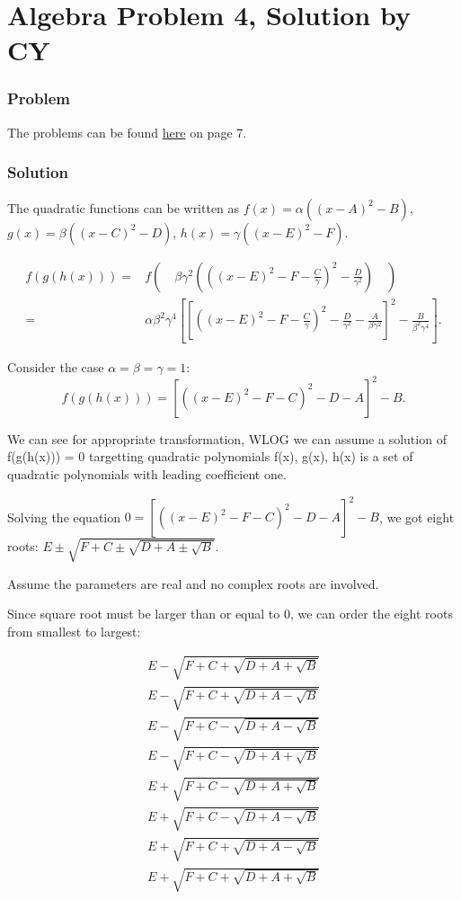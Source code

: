 \section*{Algebra Problem 4, Solution by CY}
\subsubsection*{Problem}
The problems can be found \href{https://www.math.hkust.edu.hk/~makyli/190_2010Sp/problemBk.pdf}{here} on page 7.

\subsubsection*{Solution}

The quadratic functions can be written as $f(x) = \alpha ((x-A)^2 - B)$, $g(x) = \beta ((x-C)^2 - D)$, $h(x) = \gamma ((x-E)^2 - F)$. 

\begin{eqnarray*}
    f(g(h(x))) =& f(\quad \beta \gamma^2(((x-E)^2-F-\frac{C}{\gamma})^2 - \frac{D}{\gamma^2}) \quad ) \\
    =& \alpha \beta^2 \gamma^4 [ [ ((x-E)^2-F-\frac{C}{\gamma})^2 - \frac{D}{\gamma^2} - \frac{A}{\beta\gamma^2} ]^2 - \frac{B}{\beta^2\gamma^4} ]. 
\end{eqnarray*}

Consider the case $\alpha = \beta = \gamma = 1$:
\begin{equation*}
    f(g(h(x))) = [((x-E)^2 - F - C)^2 - D - A]^2 - B.
\end{equation*}

We can see for appropriate transformation, WLOG we can assume a solution of f(g(h(x))) = 0 targetting quadratic polynomials f(x), g(x), h(x) is a set of quadratic polynomials with leading coefficient one.

\hspace{3em}

Solving the equation $ 0 = [((x-E)^2 - F - C)^2 - D - A]^2 - B $, we got eight roots: $E \pm \sqrt{F+C \pm \sqrt{D+A \pm \sqrt{B}}}$.

Assume the parameters are real and no complex roots are involved.

Since square root must be larger than or equal to 0, we can order the eight roots from smallest to largest:

\begin{eqnarray*}
    E - \sqrt{F+C + \sqrt{D+A + \sqrt{B}}} \\ 
    E - \sqrt{F+C + \sqrt{D+A - \sqrt{B}}} \\ 
    E - \sqrt{F+C - \sqrt{D+A - \sqrt{B}}} \\ 
    E - \sqrt{F+C - \sqrt{D+A + \sqrt{B}}} \\ 
    E + \sqrt{F+C - \sqrt{D+A + \sqrt{B}}} \\ 
    E + \sqrt{F+C - \sqrt{D+A - \sqrt{B}}} \\ 
    E + \sqrt{F+C + \sqrt{D+A - \sqrt{B}}} \\ 
    E + \sqrt{F+C + \sqrt{D+A + \sqrt{B}}} \\ 
\end{eqnarray*}

